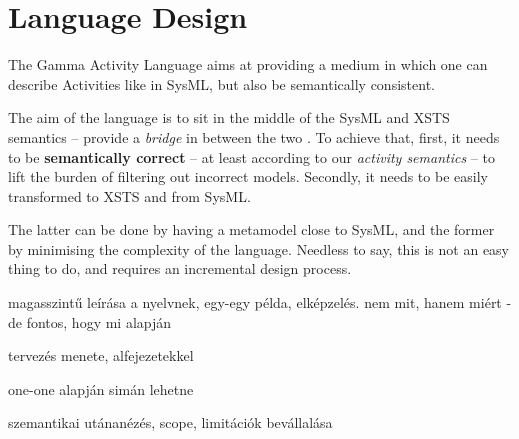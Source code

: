 \section{Language Design}

The Gamma Activity Language aims at providing a medium in which one can describe Activities like in SysML, but also be semantically consistent.

The aim of the language is to sit in the middle of the SysML and XSTS semantics -- provide a \emph{bridge} in between the two .
To achieve that, first, it needs to be \textbf{semantically correct} -- at least according to our \emph{activity semantics} -- to lift the burden of filtering out incorrect models. Secondly, it needs to be easily transformed to XSTS and from SysML.

The latter can be done by having a metamodel close to SysML, and the former by minimising the complexity of the language. Needless to say, this is not an easy thing to do, and requires an incremental design process.


magasszintű leírása a nyelvnek, egy-egy példa, elképzelés.
nem mit, hanem miért - de fontos, hogy mi alapján

tervezés menete, alfejezetekkel

one-one alapján simán lehetne

szemantikai utánanézés, scope, limitációk bevállalása